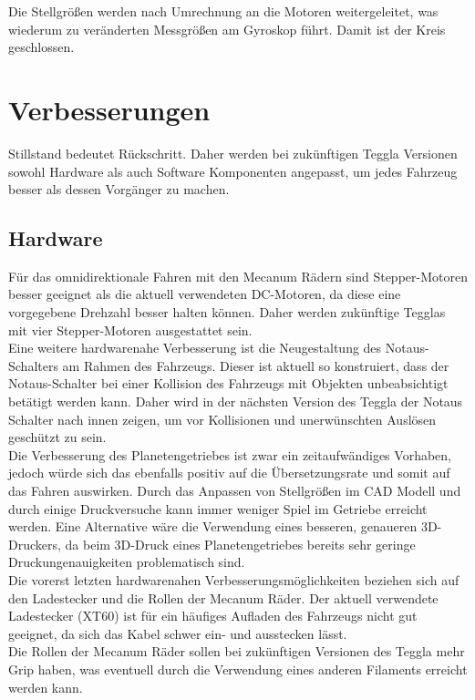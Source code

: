Die Stellgrößen werden nach Umrechnung an die Motoren weitergeleitet, was wiederum zu veränderten Messgrößen am Gyroskop führt. 
Damit ist der Kreis geschlossen. 


\section{Verbesserungen}
Stillstand bedeutet Rückschritt. Daher werden bei zukünftigen Teggla Versionen sowohl Hardware als auch Software Komponenten angepasst, um jedes Fahrzeug besser als dessen Vorgänger zu machen.

\subsection{Hardware}
Für das omnidirektionale Fahren mit den Mecanum Rädern sind Stepper-Motoren besser geeignet als die aktuell verwendeten DC-Motoren, da diese eine vorgegebene Drehzahl besser halten können. Daher werden zukünftige Tegglas mit vier Stepper-Motoren ausgestattet sein.\\

Eine weitere hardwarenahe Verbesserung ist die Neugestaltung des Notaus-Schalters am Rahmen des Fahrzeugs. Dieser ist aktuell so konstruiert, dass der Notaus-Schalter bei einer Kollision des Fahrzeugs mit Objekten unbeabsichtigt betätigt werden kann. Daher wird in der nächsten Version des Teggla der Notaus Schalter nach innen zeigen, um vor Kollisionen und unerwünschten Auslösen geschützt zu sein.\\

Die Verbesserung des Planetengetriebes ist zwar ein zeitaufwändiges Vorhaben, jedoch würde sich das ebenfalls positiv auf die Übersetzungsrate und somit auf das Fahren auswirken. Durch das Anpassen von Stellgrößen im CAD Modell und durch einige Druckversuche kann immer weniger Spiel im Getriebe erreicht werden. Eine Alternative wäre die Verwendung eines besseren, genaueren 3D-Druckers, da beim 3D-Druck eines Planetengetriebes bereits sehr geringe Druckungenauigkeiten problematisch sind.\\

Die vorerst letzten hardwarenahen Verbesserungsmöglichkeiten beziehen sich auf den Ladestecker und die Rollen der Mecanum Räder. Der aktuell verwendete Ladestecker (XT60) ist für ein häufiges Aufladen des Fahrzeugs nicht gut geeignet, da sich das Kabel schwer ein- und ausstecken lässt.\\

Die Rollen der Mecanum Räder sollen bei zukünftigen Versionen des Teggla mehr Grip haben, was eventuell durch die Verwendung eines anderen Filaments erreicht werden kann.\\


